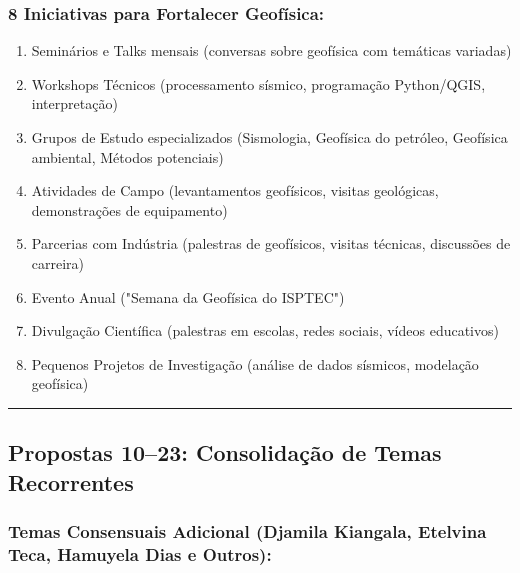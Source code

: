 \documentclass[12pt,a4paper]{article}
\begin{document}
\subsubsection*{8 Iniciativas para Fortalecer Geofísica:}

\begin{enumerate}[itemsep=0.15cm]
    \item Seminários e Talks mensais (conversas sobre geofísica com temáticas variadas)
    \item Workshops Técnicos (processamento sísmico, programação Python/QGIS, interpretação)
    \item Grupos de Estudo especializados (Sismologia, Geofísica do petróleo, Geofísica ambiental, Métodos potenciais)
    \item Atividades de Campo (levantamentos geofísicos, visitas geológicas, demonstrações de equipamento)
    \item Parcerias com Indústria (palestras de geofísicos, visitas técnicas, discussões de carreira)
    \item Evento Anual ("Semana da Geofísica do ISPTEC")
    \item Divulgação Científica (palestras em escolas, redes sociais, vídeos educativos)
    \item Pequenos Projetos de Investigação (análise de dados sísmicos, modelação geofísica)
\end{enumerate}

\textcolor{spe-secondary}{\hspace{0.5cm}\rule{0.4\linewidth}{0.8pt}}

\subsection{Propostas 10–23: Consolidação de Temas Recorrentes}

\subsubsection*{Temas Consensuais Adicional (Djamila Kiangala, Etelvina Teca, Hamuyela Dias e Outros):}
\end{document}
